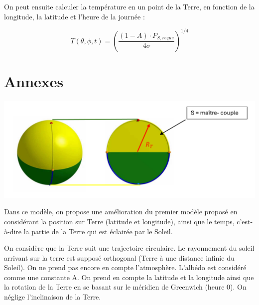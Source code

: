 \documentclass[a4paper,11pt]{article}
\begin{document}
On peut ensuite calculer la température en un point de la Terre, en fonction de la longitude, la latitude et l'heure de la journée :

\[ T (\theta , \phi , t) = \left(\dfrac{(1 - A) \cdot P_{S,reçue}}{4\sigma}\right)^{1/4} \]


\newpage
\section{Annexes}

\begin{adjustbox}{center}
\includegraphics[scale=0.9]{Schema_maitre_couple}
\end{adjustbox}

Dans ce modèle, on propose une amélioration du premier modèle proposé en considérant la position sur Terre (latitude et longitude), ainsi que le temps, c'est-à-dire la partie de la Terre qui est éclairée par le Soleil.

On considère que la Terre suit une trajectoire circulaire. Le rayonnement du soleil arrivant sur la terre est supposé orthogonal (Terre à une distance infinie du Soleil). On ne prend pas encore en compte l'atmosphère. L'albédo est considéré comme une constante A. On prend en compte la latitude et la longitude ainsi que la rotation de la Terre en se basant sur le méridien de Greenwich (heure 0). On néglige l'inclinaison de la Terre.
\end{document}
